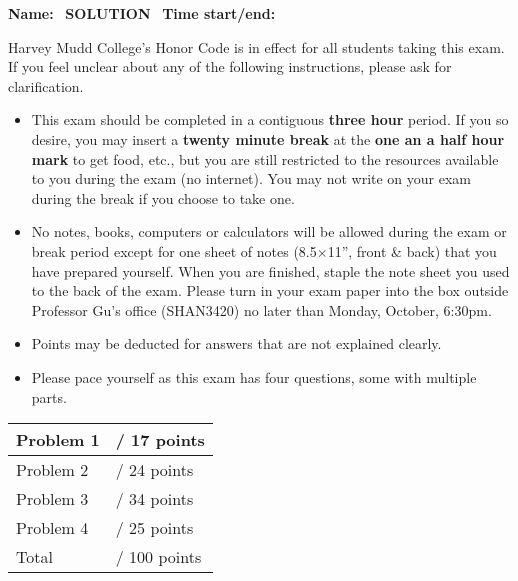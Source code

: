 \documentclass[letter, 12pt]{article}
\begin{document}
\begin{large}
\noindent \textbf{Name:} \hrulefill ~\textbf{SOLUTION} \hrulefill 
\mbox{ }\textbf{Time start/end:} \hrulefill \hrulefill

\vspace{.3in}
Harvey Mudd College's Honor Code is in effect for all students taking this
exam.  If you feel unclear about any of the following instructions,
please ask for clarification.

\begin{itemize}
\item This exam should be completed in a contiguous \textbf{three hour} period.
    If you so desire, you may insert a \textbf{twenty minute break} at the
    \textbf{one an a half hour mark} to get food, etc., but you are still restricted
    to the resources available to you during the exam (no internet). You may not
    write on your exam during the break if you choose to take one.
\item No notes, books, computers or calculators will be allowed during
  the exam or break period except for one sheet of notes (8.5$\times$11'', front \&
  back) that you have prepared yourself.  When you are finished,
  staple the note sheet you used to the back of the exam.  Please turn in your exam paper 
  into the box outside Professor Gu's office (SHAN3420) no later than Monday, October, 6:30pm.
\item Points may be deducted for answers that are not explained clearly.
\item Please pace yourself as this exam has four questions, some with
  multiple parts.
\end{itemize}
\end{large}
\vspace{.1 in}
\begin{center} \begin{Large}
\begin{tabular}[b]{|l|l|} \hline
 Problem 1 & \hspace{.5 in} / 17 points \\ \hline
 Problem 2 & \hspace{.5 in} / 24 points \\ \hline
 Problem 3 & \hspace{.5 in} / 34 points \\ \hline
 Problem 4 & \hspace{.5 in} / 25 points \\ \hline
 Total     & \hspace{.5 in} / 100 points \\ \hline 
\end{tabular} \end{Large}
\end{center}
\end{document}
